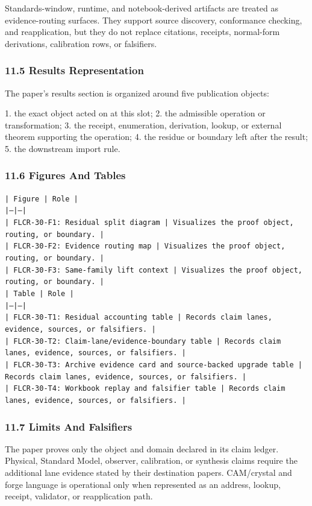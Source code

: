 \documentclass[11pt]{article}
\begin{document}
Standards-window, runtime, and notebook-derived artifacts are treated
as evidence-routing surfaces. They support source discovery, conformance
checking, and reapplication, but they do not replace citations, receipts,
normal-form derivations, calibration rows, or falsifiers.

\subsubsection*{11.5 Results Representation}

The paper's results section is organized around five publication objects:

1. the exact object acted on at this slot;
2. the admissible operation or transformation;
3. the receipt, enumeration, derivation, lookup, or external theorem supporting
   the operation;
4. the residue or boundary left after the result;
5. the downstream import rule.

\subsubsection*{11.6 Figures And Tables}

\noindent\texttt{| Figure | Role |}\\
\noindent\texttt{|---|---|}\\
\noindent\texttt{| FLCR-30-F1: Residual split diagram | Visualizes the proof object, routing, or boundary. |}\\
\noindent\texttt{| FLCR-30-F2: Evidence routing map | Visualizes the proof object, routing, or boundary. |}\\
\noindent\texttt{| FLCR-30-F3: Same-family lift context | Visualizes the proof object, routing, or boundary. |}\\

\noindent\texttt{| Table | Role |}\\
\noindent\texttt{|---|---|}\\
\noindent\texttt{| FLCR-30-T1: Residual accounting table | Records claim lanes, evidence, sources, or falsifiers. |}\\
\noindent\texttt{| FLCR-30-T2: Claim-lane/evidence-boundary table | Records claim lanes, evidence, sources, or falsifiers. |}\\
\noindent\texttt{| FLCR-30-T3: Archive evidence card and source-backed upgrade table | Records claim lanes, evidence, sources, or falsifiers. |}\\
\noindent\texttt{| FLCR-30-T4: Workbook replay and falsifier table | Records claim lanes, evidence, sources, or falsifiers. |}\\

\subsubsection*{11.7 Limits And Falsifiers}

The paper proves only the object and domain declared in its claim ledger.
Physical, Standard Model, observer, calibration, or synthesis claims require
the additional lane evidence stated by their destination papers. CAM/crystal
and forge language is operational only when represented as an address, lookup,
receipt, validator, or reapplication path.
\end{document}
